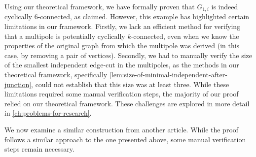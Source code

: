\documentclass[12pt, twoside]{book}
\begin{document}
Using our theoretical framework, we have formally proven that $G_{1,i}$ is indeed cyclically 6-connected, as claimed. However, this example has highlighted certain limitations in our framework. Firstly, we lack an efficient method for verifying that a multipole is potentially cyclically $k$-connected, even when we know the properties of the original graph from which the multipole was derived (in this case, by removing a pair of vertices). Secondly, we had to manually verify the size of the smallest independent edge-cut in the multipoles, as the methods in our theoretical framework, specifically \cref{lem:size-of-minimal-independent-after-junction}, could not establish that this size was at least three. While these limitations required some manual verification steps, the majority of our proof relied on our theoretical framework. These challenges are explored in more detail in \cref{ch:problems-for-research}.

We now examine a similar construction from another article. While the proof follows a similar approach to the one presented above, some manual verification steps remain necessary.
\end{document}
